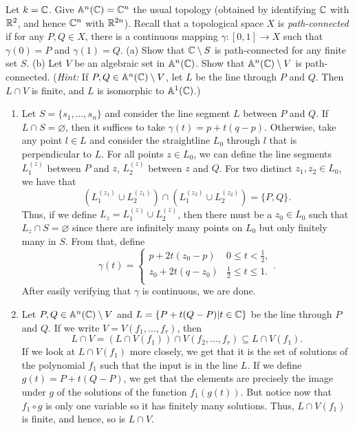 \begin{exercise}
    Let $k = \mathbb{C}$. Give $\mathbb{A}^n(\mathbb{C}) = \mathbb{C}^n$ the usual topology (obtained by identifying $\mathbb{C}$ with $\mathbb{R}^2$, and hence $\mathbb{C}^n$ with $\mathbb{R}^{2n}$). Recall that a topological space $X$ is \textit{path-connected} if for any $P,Q \in X$, there is a continuous mapping $\gamma : [0,1] \to X$ such that $\gamma(0) = P$ and $\gamma(1) = Q$. (a) Show that $\mathbb{C} \setminus S$ is path-connected for any finite set $S$. (b) Let $V$ be an algebraic set in $\mathbb{A}^n(\mathbb{C})$. Show that $\mathbb{A}^n(\mathbb{C}) \setminus V$ is path-connected. (\textit{Hint:} If $P,Q \in \mathbb{A}^n(\mathbb{C}) \setminus V$, let $L$ be the line through $P$ and $Q$. Then $L \cap V$ is finite, and $L$ is isomorphic to $\mathbb{A}^1(\mathbb{C})$.) \\
\end{exercise}

\begin{solution}
    \begin{enumerate}
        \item Let $S = \{s_1, ..., s_n\}$ and consider the line segment $L$ between $P$ and $Q$. If $L\cap S = \varnothing$, then it suffices to take $\gamma(t) = p + t(q-p)$. Otherwise, take any point $l \in L$ and consider the straightline $L_0$ through $l$ that is perpendicular to $L$. For all points $z \in L_0$, we can define the line segments $L_1^{(z)}$ between $P$ and $z$, $L_2^{(z)}$ between $z$ and $Q$. For two distinct $z_1, z_2 \in L_0$, we have that
        $$(L_1^{(z_1)} \cup L_2^{(z_1)})\cap (L_1^{(z_2)} \cup L_2^{(z_2)}) = \{P,Q\}.$$
        Thus, if we define $L_z = L_1^{(z)} \cup L_2^{(z)}$, then there must be a $z_0 \in L_0$ such that $L_z \cap S = \varnothing$ since there are infinitely many points on $L_0$ but only finitely many in $S$. From that, define 
        $$\gamma(t) = \begin{cases}
            p+2t(z_0 - p) & 0 \leq t < \frac{1}{2}, \\
            z_0+2t(q - z_0) & \frac{1}{2} \leq t \leq 1. \\
        \end{cases}.$$
        After easily verifying that $\gamma$ is continuous, we are done.
        \item Let $P,Q \in \mathbb{A}^n(\mathbb{C}) \setminus V$ and $L = \{P + t(Q-P) | t \in \mathbb{C}\}$ be the line through $P$ and $Q$. If we write $V = V(f_1, ..., f_r)$, then
        $$L\cap V = (L\cap V(f_1)) \cap V(f_2, ..., f_r) \subseteq L\cap V(f_1).$$
        If we look at $L \cap V(f_1)$ more closely, we get that it is the set of solutions of the polynomial $f_1$ such that the input is in the line $L$. If we define $g(t) = P + t(Q-P)$, we get that the elements are precisely the image under $g$ of the solutions of the function $f_1(g(t))$. But notice now that $f_1 \circ g$ is only one variable so it has finitely many solutions. Thus, $L \cap V(f_1)$ is finite, and hence, so is $L \cap V$.
        

\end{enumerate}
\end{solution}
